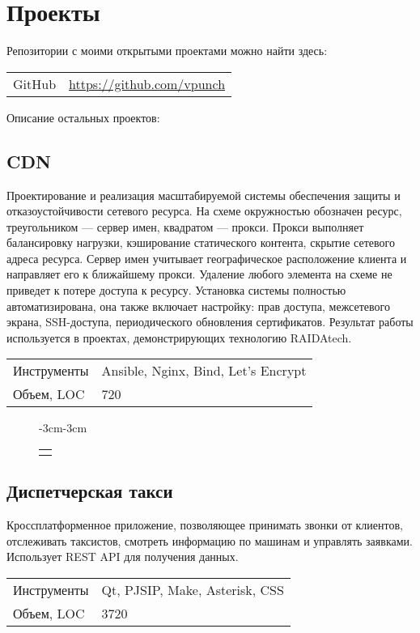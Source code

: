 \documentclass[a4paper]{article}
\makeatletter
\newenvironment{figcont}[1]{
    \begin{figure}[H]
        \begin{adjustwidth}{-3cm}{-3cm}
        \centering
        \begin{tabular}{*{#1}c}
}{
        \end{tabular}
        \end{adjustwidth}
    \end{figure}
}
\newcommand{\subfig}[2]{
    \subfloat[#1]{\texttt{[image: figs/\#2]}}
}
\newenvironment{props}{
    \begin{tabular}{@{}lN{8cm}@{}}
}{
    \end{tabular}
}
\makeatother
\begin{document}
\section*{Проекты}

Репозитории с моими открытыми проектами можно найти здесь:

\begin{tabular}{lN{10cm}}
    GitHub & \url{https://github.com/vpunch}
\end{tabular}

Описание остальных проектов:

\subsection*{CDN}

Проектирование и реализация масштабируемой системы обеспечения защиты и
отказоустойчивости сетевого ресурса. На схеме окружностью обозначен ресурс,
треугольником --- сервер имен, квадратом --- прокси. Прокси выполняет
балансировку нагрузки, кэширование статического контента, скрытие сетевого
адреса ресурса. Сервер имен учитывает географическое расположение клиента и
направляет его к ближайшему прокси. Удаление любого элемента на схеме не
приведет к потере доступа к ресурсу. Установка системы полностью
автоматизирована, она также включает настройку: прав доступа, межсетевого
экрана, SSH-доступа, периодического обновления сертификатов. Результат работы
используется в проектах, демонстрирующих технологию RAIDAtech.

\begin{props}
    Инструменты & Ansible, Nginx, Bind, Let’s Encrypt \\
    Объем, LOC & 720
\end{props}

\begin{figcont}{1}
    \subfig{Схема кластера}{cdn1}
\end{figcont}

\subsection*{Диспетчерская такси}

Кроссплатформенное приложение, позволяющее принимать звонки от клиентов,
отслеживать таксистов, смотреть информацию по машинам и управлять заявками.
Использует REST API для получения данных.

\begin{props}
    Инструменты & Qt, PJSIP, Make, Asterisk, CSS \\
    Объем, LOC & 3720
\end{props}
\end{document}
